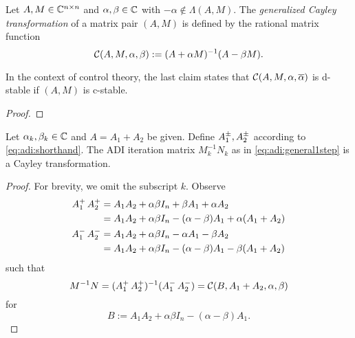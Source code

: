 \begin{lemma}
\label{thm:adi:cayley}
  Let $A, M\in\mathbb{C}^{n\times n}$ and $\alpha, \beta \in\mathbb{C}$ with $-\alpha\notin\Lambda(A, M)$.
  The \emph{generalized Cayley transformation} of a matrix pair $(A,M)$ is defined by
  the rational matrix function
  \begin{equation*}
    \mathcal{C}(A, M, \alpha, \beta) := (A+\alpha M)^{-1} (A-\beta M).
  \end{equation*}
\end{lemma}
\begin{remark}
  In the context of control theory,
  the last claim states that
  $\Cayley(A, M, \alpha, \conj\alpha)$ is d-stable if
  $(A, M)$ is c-stable.
\end{remark}
\begin{proof}
\end{proof}

\begin{lemma}
  Let $\alpha_k,\beta_k\in\mathbb{C}$ and $A=A_1+A_2$ be given.
  Define $\mathop{A_1^\pm}, \mathop{A_2^\pm}$ according to \eqref{eq:adi:shorthand}.
  The \ac{ADI} iteration matrix $M_k^{-1}N_k$ as in \eqref{eq:adi:general1step} is a Cayley transformation.
\end{lemma}
\begin{proof}
  For brevity, we omit the subscript $k$.
  Observe
  \begin{align*}
    \mathop{A_1^+}\mathop{A_2^+}
    &= A_1A_2 + \alpha\beta I_n + \beta A_1 + \alpha A_2 \\
    &= A_1A_2 + \alpha\beta I_n - (\alpha-\beta)A_1 + \alpha(A_1 + A_2) \\
    \mathop{A_1^-}\mathop{A_2^-}
    &= A_1A_2 + \alpha\beta I_n - \alpha A_1 - \beta A_2 \\
    &= A_1A_2 + \alpha\beta I_n - (\alpha-\beta)A_1 - \beta(A_1 + A_2)
  \end{align*}
  such that
  \begin{equation*}
    M^{-1}N
    = (\mathop{A_1^+}\mathop{A_2^+})^{-1}(\mathop{A_1^-}\mathop{A_2^-})
    = \mathcal{C}(B, A_1+A_2, \alpha, \beta)
  \end{equation*}
  for
  \begin{equation*}
    B := A_1A_2 + \alpha\beta I_n - (\alpha-\beta)A_1
    .
  \end{equation*}
\end{proof}

